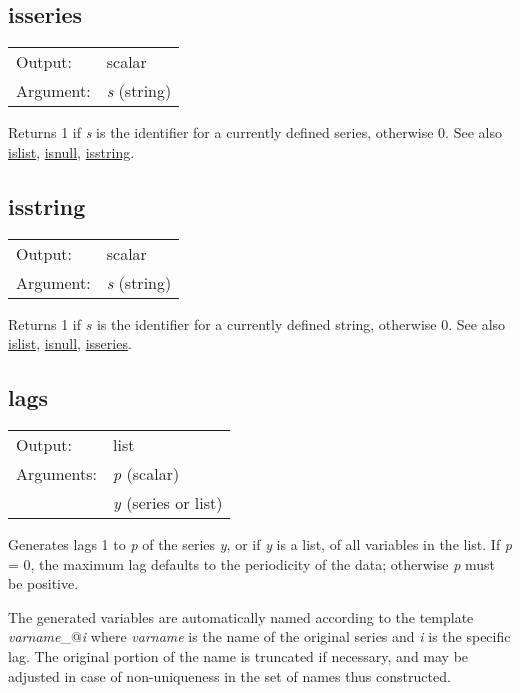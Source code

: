 \subsection{isseries}
\hypertarget{func-isseries}{}

\begin{tabular}{ll}
Output:     & scalar\\
Argument:   & \textsl{s} (string)\\
\end{tabular}

	  Returns 1 if \textsl{s} is the identifier for a
	  currently defined series, otherwise 0.
	  See also \hyperlink{func-islist}{islist}, \hyperlink{func-isnull}{isnull}, \hyperlink{func-isstring}{isstring}.

\subsection{isstring}
\hypertarget{func-isstring}{}

\begin{tabular}{ll}
Output:     & scalar\\
Argument:   & \textsl{s} (string)\\
\end{tabular}

	  Returns 1 if \ensuremath{s} is the identifier for a currently
	  defined string, otherwise 0.
	  See also \hyperlink{func-islist}{islist}, \hyperlink{func-isnull}{isnull}, \hyperlink{func-isseries}{isseries}.

\subsection{lags}
\hypertarget{func-lags}{}

\begin{tabular}{ll}
Output:     & list\\
Arguments:  & \textsl{p} (scalar)\\
           & \textsl{y} (series or list)\\
\end{tabular}

	  Generates lags 1 to \textsl{p} of the series
	  \textsl{y}, or if \textsl{y} is a list, of all
	  variables in the list.  If \textsl{p} = 0, the maximum
	  lag defaults to the periodicity of the data; otherwise
	  \textsl{p} must be positive.

	  The generated variables are automatically named according to
	  the template \textsl{varname}\verb@_@\textsl{i} where
	  \textsl{varname} is the name of the original series and
	  \textsl{i} is the specific lag.  The original portion of the
	  name is truncated if necessary, and may be adjusted in case of
	  non-uniqueness in the set of names thus constructed.  

